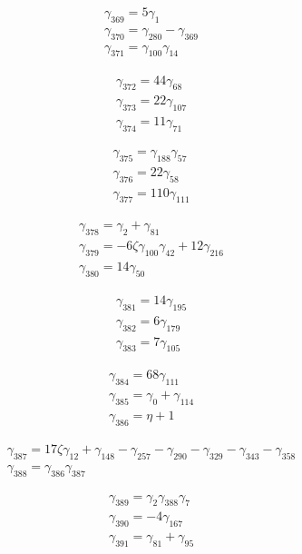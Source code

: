 \[\begin{aligned}\gamma_{369}=5 \gamma_{1}\\ \gamma_{370}=\gamma_{280} - \gamma_{369}\\ \gamma_{371}=\gamma_{100} \gamma_{14}\end{aligned}\]

\[\begin{aligned}\gamma_{372}=44 \gamma_{68}\\ \gamma_{373}=22 \gamma_{107}\\ \gamma_{374}=11 \gamma_{71}\end{aligned}\]

\[\begin{aligned}\gamma_{375}=\gamma_{188} \gamma_{57}\\ \gamma_{376}=22 \gamma_{58}\\ \gamma_{377}=110 \gamma_{111}\end{aligned}\]

\[\begin{aligned}\gamma_{378}=\gamma_{2} + \gamma_{81}\\ \gamma_{379}=- 6 \zeta  \gamma_{100} \gamma_{42} + 12 \gamma_{216}\\ \gamma_{380}=14 \gamma_{50}\end{aligned}\]

\[\begin{aligned}\gamma_{381}=14 \gamma_{195}\\ \gamma_{382}=6 \gamma_{179}\\ \gamma_{383}=7 \gamma_{105}\end{aligned}\]

\[\begin{aligned}\gamma_{384}=68 \gamma_{111}\\ \gamma_{385}=\gamma_{0} + \gamma_{114}\\ \gamma_{386}=\eta  + 1\end{aligned}\]

\[\begin{aligned}\gamma_{387}=17 \zeta  \gamma_{12} + \gamma_{148} - \gamma_{257} - \gamma_{290} - \gamma_{329} - \gamma_{343} - \gamma_{358}\\ \gamma_{388}=\gamma_{386} \gamma_{387}\end{aligned}\]

\[\begin{aligned}\gamma_{389}=\gamma_{2} \gamma_{388} \gamma_{7}\\ \gamma_{390}=- 4 \gamma_{167}\\ \gamma_{391}=\gamma_{81} + \gamma_{95}\end{aligned}\]

